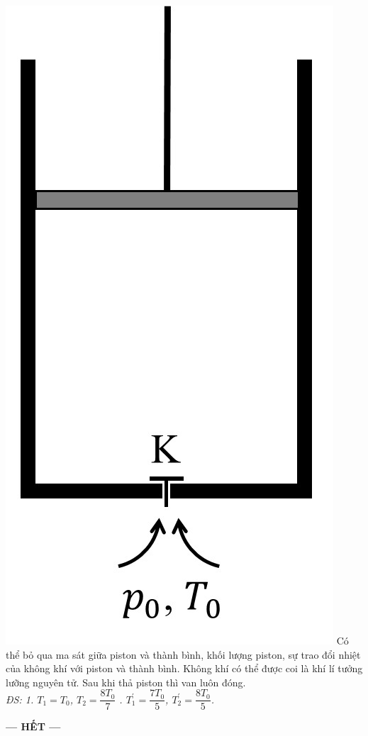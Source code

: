 \begin{ex}
{\includegraphics[scale=0.4]{figs/OLP-NHIET-02}}
	Có thể bỏ qua ma sát giữa piston và thành bình, khối lượng piston, sự trao đổi nhiệt của không khí với piston và thành bình. Không khí có thể được coi là khí lí tưởng lưỡng nguyên tử. Sau khi thả piston thì van luôn đóng.\\
	\hspace*{0pt}\hfill\textit{ĐS: 1. $T_1=T_0$, $T_2=\dfrac{8T_0}{7}$ . $T^\prime_1=\dfrac{7T_0}{5}$, $T^\prime_2=\dfrac{8T_0}{5}$.}
	\loigiai{
		
	}
\end{ex}
\begin{center}
	\textbf{--- HẾT ---}
\end{center}
